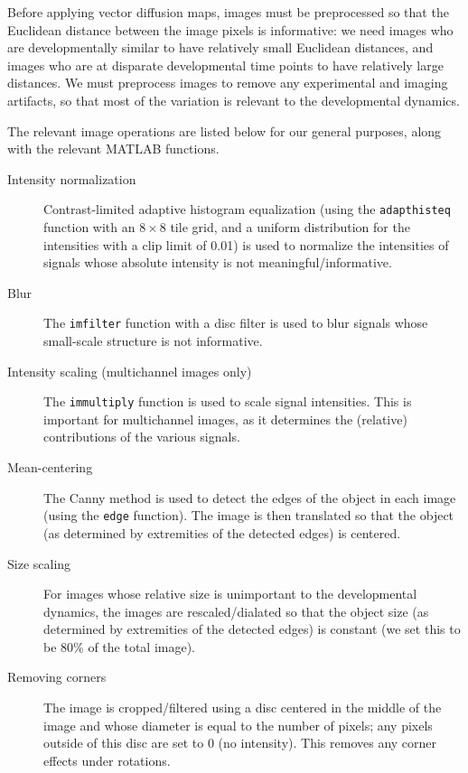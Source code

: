 Before applying vector diffusion maps, images must be preprocessed so that the Euclidean distance between the image pixels is informative: we need images who are developmentally similar to have relatively small Euclidean distances, and images who are at disparate developmental time points to have relatively large distances.
%
We must preprocess images to remove any experimental and imaging artifacts, so that most of the variation is relevant to the developmental dynamics.

The relevant image operations are listed below for our general purposes, along with the relevant MATLAB functions.
\begin{description}

\item[Intensity normalization] Contrast-limited adaptive histogram equalization (using the \texttt{adapthisteq} function with an $8 \times 8$ tile grid, and a uniform distribution for the intensities with a clip limit of 0.01) is used to normalize the intensities of signals whose absolute intensity is not meaningful/informative.
%
\item[Blur] The \texttt{imfilter} function with a disc filter is used to blur signals whose small-scale structure is not informative.
%
\item[Intensity scaling (multichannel images only)] The \texttt{immultiply} function is used to scale signal intensities. This is important for multichannel images, as it determines the (relative) contributions of the various signals.
%
\item[Mean-centering]  The Canny method \citep{canny1986computational} is used to detect the edges of the object in each image (using the \texttt{edge} function). The image is then translated so that the object (as determined by extremities of the detected edges) is centered.
%
\item[Size scaling] For images whose relative size is unimportant to the developmental dynamics, the images are rescaled/dialated so that the object size (as determined by extremities of the detected edges) is constant (we set this to be 80\% of the total image).
%
\item[Removing corners] The image is cropped/filtered using a disc centered in the middle of the image and whose diameter is equal to the number of pixels; any pixels outside of this disc are set to 0 (no intensity). This removes any corner effects under rotations.
\end{description}



